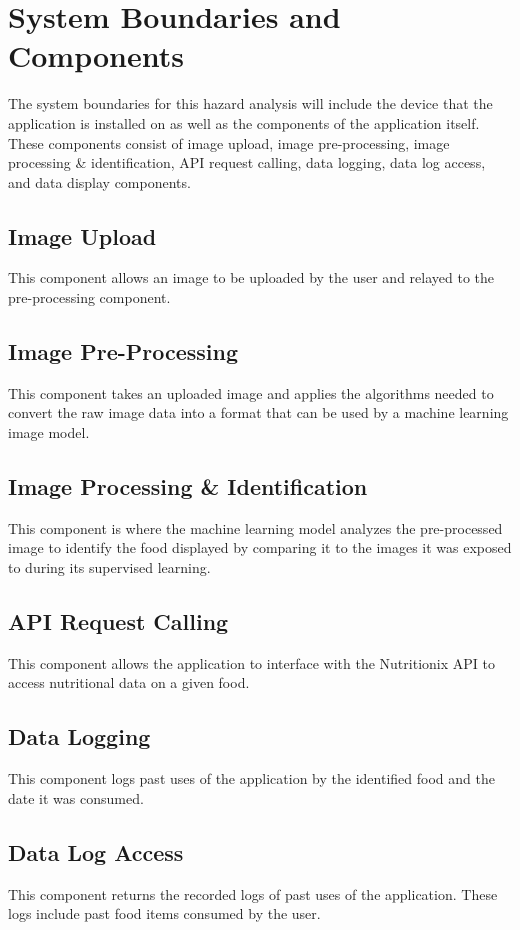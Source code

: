 \documentclass{article}
\begin{document}
\section{System Boundaries and Components}
The system boundaries for this hazard analysis will include the device that the application is installed on as well as the components of the application itself. These components consist of image upload, image pre-processing, image processing \& identification, API request calling, data logging, data log access, and data display components.

\subsection{Image Upload}
This component allows an image to be uploaded by the user and relayed to the pre-processing component.

\subsection{Image Pre-Processing}
This component takes an uploaded image and applies the algorithms needed to convert the raw image data into a format that can be used by a machine learning image model.

\subsection{Image Processing \& Identification}
This component is where the machine learning model analyzes the pre-processed image to identify the food displayed by comparing it to the images it was exposed to during its supervised learning. 

\subsection{API Request Calling}
This component allows the application to interface with the Nutritionix API to access nutritional data on a given food.  

\subsection{Data Logging}
This component logs past uses of the application by the identified food and the date it was consumed.   

\subsection{Data Log Access}
This component returns the recorded logs of past uses of the application. These logs include past food items consumed by the user.
\end{document}
